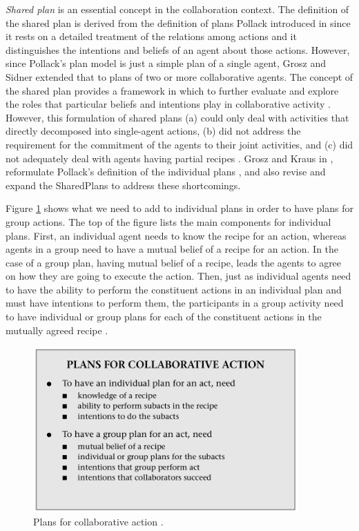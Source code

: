 \documentclass[11pt]{article}
\begin{document}
\textit{Shared plan} is an essential concept in the collaboration context.
The definition of the shared plan is derived from the definition of plans
Pollack introduced in \cite{pollack:plan-inference,
pollack:plan-mental-attitudes} since it rests on a detailed treatment of the
relations among actions and it distinguishes the intentions and beliefs of an
agent about those actions. However, since Pollack's plan model is just a simple
plan of a single agent, Grosz and Sidner extended that to plans of two or more
collaborative agents. The concept of the shared plan provides a framework in
which to further evaluate and explore the roles that particular beliefs and
intentions play in collaborative activity \cite{lochbaum:plan-models}. However,
this formulation of shared plans (a) could only deal with activities that
directly decomposed into single-agent actions, (b) did not address the
requirement for the commitment of the agents to their joint activities, and (c)
did not adequately deal with agents having partial recipes
\cite{grosz:collaboration}. Grosz and Kraus in \cite{grosz:collaboration},
reformulate Pollack's definition of the individual plans
\cite{pollack:plan-mental-attitudes}, and also revise and expand the SharedPlans
to address these shortcomings.

Figure \ref{fig:plans} shows what we need to add to individual plans in order to
have plans for group actions. The top of the figure lists the main components
for individual plans. First, an individual agent needs to know the recipe for an
action, whereas agents in a group need to have a mutual belief of a recipe for
an action. In the case of a group plan, having mutual belief of a recipe, leads
the agents to agree on how they are going to execute the action. Then, just as
individual agents need to have the ability to perform the constituent actions in
an individual plan and must have intentions to perform them, the participants in
a group activity need to have individual or group plans for each of the
constituent actions in the mutually agreed recipe
\cite{grosz:collaborative-systems, grosz:plans-discourse}.

\begin{figure}[tbh]
  \center
  \includegraphics[width=0.9\textwidth]{figure/plans.png}
  \caption{Plans for collaborative action \cite{grosz:collaborative-systems}.}
  \label{fig:plans}
\end{figure}
\end{document}
